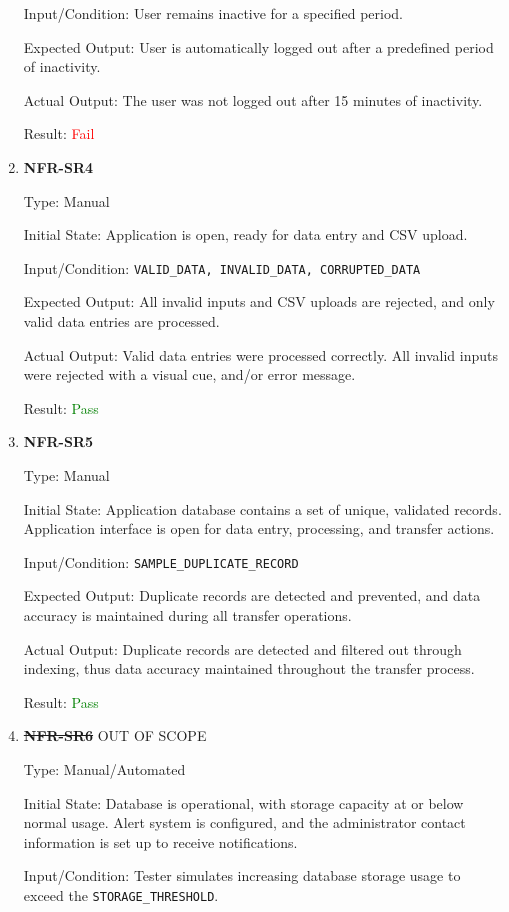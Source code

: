 \documentclass[12pt, titlepage]{article}
\begin{document}
\begin{enumerate}
Input/Condition: User remains inactive for a specified period.

Expected Output: User is automatically logged out after a predefined period of
inactivity.

Actual Output: The user was not logged out after 15 minutes of inactivity.

Result: \textcolor{red}{Fail}
\item{\textbf{NFR-SR4}} \label{NFR:SR4}

Type: Manual

Initial State: Application is open, ready for data entry and CSV upload.

Input/Condition: \texttt{VALID\_DATA, INVALID\_DATA, CORRUPTED\_DATA}

Expected Output: All invalid inputs and CSV uploads are rejected, and only valid
data entries are processed.

Actual Output: Valid data entries were processed correctly. All invalid inputs
were rejected with a visual cue, and/or error message.

Result: \textcolor{green}{Pass}

  \item{\textbf{NFR-SR5}} \label{NFR:SR5}

Type: Manual

Initial State: Application database contains a set of unique, validated records.
Application interface is open for data entry, processing, and transfer actions.

Input/Condition: \texttt{SAMPLE\_DUPLICATE\_RECORD}

Expected Output: Duplicate records are detected and prevented, and data accuracy
is maintained during all transfer operations.

Actual Output: Duplicate records are detected and filtered out through indexing, thus data accuracy maintained
throughout the transfer process.

Result: \textcolor{green}{Pass}

\item{\textbf{\st{NFR-SR6}}} OUT OF SCOPE \label{NFR:SR6}

Type: Manual/Automated

Initial State: Database is operational, with storage capacity at or below normal
usage. Alert system is configured, and the administrator contact information is
set up to receive notifications. 

Input/Condition: Tester simulates increasing database storage usage to exceed
the \texttt{STORAGE\_THRESHOLD}.


\end{enumerate}
\end{document}
